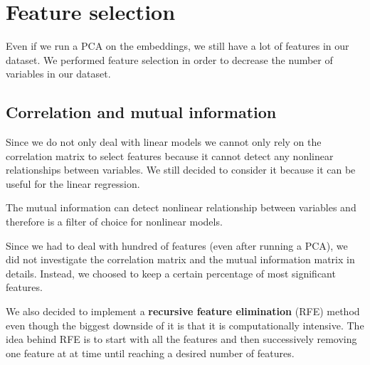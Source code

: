 \section{Feature selection}

Even if we run a PCA on the embeddings, we still have a lot of features in our dataset. We performed feature selection in order to decrease the number of variables in our dataset.

\subsection{Correlation and mutual information}

Since we do not only deal with linear models we cannot only rely on the correlation matrix to select features because it cannot detect any nonlinear relationships between variables. We still decided to consider it because it can be useful for the linear regression. 

The mutual information can detect nonlinear relationship between variables and therefore is a filter of choice for nonlinear models. 

Since we had to deal with hundred of features (even after running a PCA), we did not investigate the correlation matrix and the mutual information matrix in details. Instead, we choosed to keep a certain percentage of most significant features.

We also decided to implement a \textbf{recursive feature elimination} (RFE) method even though the biggest downside of it is that it is computationally intensive. The idea behind RFE is to start with all the features and then successively removing one feature at at time until reaching a desired number of features. 

